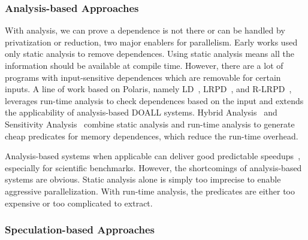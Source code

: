 
\subsubsection{Analysis-based Approaches}

With analysis, we can prove a dependence is not there or can be handled by
privatization or reduction, two major enablers for parallelism. Early works
used only static analysis to remove dependences. Using static analysis means all
the information should be available at compile time. However, there are a lot of
programs with input-sensitive dependences which are removable for certain
inputs. A line of work based on Polaris, namely LD~\cite{rauchwerger:94:ics},
LRPD~\cite{rauchwerger:99:pds}, and R-LRPD~\cite{dang:02:ipdps}, leverages
run-time analysis to check dependences based on the input and extends the
applicability of analysis-based DOALL systems.  Hybrid
Analysis~\cite{rus:03:hybrid} and Sensitivity Analysis~\cite{Rus:07:ics} combine
static analysis and run-time analysis to generate cheap predicates for memory
dependences, which reduce the run-time overhead.

Analysis-based systems when applicable can deliver good predictable
speedups~\cite{campanoni:2012:iscgo, raman:2008:iscgo, suif:94:stanford,
Rus:07:ics}, especially for scientific benchmarks.
However, the shortcomings of analysis-based systems are obvious. Static
analysis alone is simply too imprecise to enable aggressive parallelization.
With run-time analysis, the predicates are either too expensive or too
complicated to extract.

\subsubsection{Speculation-based Approaches}

